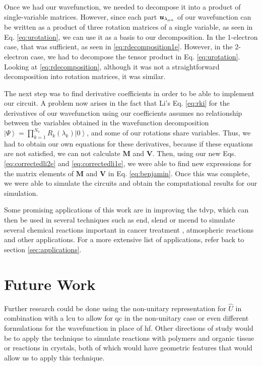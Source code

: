 \documentclass{aux/ttuthes2007}
\newcommand{\ket}[1]{\ensuremath{\left|#1\right\rangle}}
\newcommand{\ind}[1]{{\uo #1 \oo #1}}
\newcommand{\uo}[1]{
		\IfEqCase{#1}{
			{0}{\mu}
			{1}{\nu}
			{2}{\xi}
		}[\PackageError{uo}{Undefined option to uo: #1}{}]
}
\newcommand{\oo}[1]{
		\IfEqCase{#1}{
			{0}{\alpha}
			{1}{\beta}
			{2}{\gamma}
		}[\PackageError{unocorb}{Undefined option to unuo: #1}{}]
}
\begin{document}
Once we had our wavefunction, we needed to decompose it into a product of single-variable matrices.
However, since each part $\bm u_{\lambda_\ind 0}$ of our wavefunction can be written as a product of three rotation matrices of a single variable, as seen in Eq. \ref{eq:urotation}, we can use it as a basis to our decomposition.
In the 1-electron case, that was sufficient, as seen in \ref{eq:rdecomposition1e}.
However, in the 2-electron case, we had to decompose the tensor product in Eq. \ref{eq:urotation}.
Looking at \ref{eq:rdecomposition}, although it was not a straightforward decomposition into rotation matrices, it was similar.

The next step was to find derivative coefficients in order to be able to implement our circuit.
A problem now arises in the fact that Li's  Eq. \ref{eq:rki} for the derivatives of our wavefunction using our coefficients assumes no relationship between the variables obtained in the wavefunction decomposition 
$\ket \Psi = \prod_{k=1}^{N_v} R_k(\lambda_k) \ket 0$,
and some of our rotations share variables.
Thus, we had to obtain our own equations for these derivatives, because if these equations are not satisfied, we can not calculate $\bm M$ and $\bm V$.
Then, using our new Eqs. \ref{eq:correctedli2e} and \ref{eq:correctedli1e}, we were able to find new expressions for the matrix elements of $\bm M$ and $\bm V$ in Eq. \ref{eq:benjamin}.
Once this was complete, we were able to simulate the circuits and obtain the computational results for our simulation. 

Some promising applications of this work are in improving the \gls{tdvp}, which can then be used in several techniques such as \gls{end}, \gls{slend} or \gls{mcend} to simulate several chemical reactions important in cancer treatment , atmospheric reactions  and other applications. For a more extensive list of applications, refer back to section \ref{sec:applications}.

\section{\textbf{Future Work}}

Further research could be done using the non-unitary representation for $\hat U$ in combination with a \gls{lcu} to allow for \gls{qc} in the non-unitary case or even different formulations for the wavefunction in place of \gls{hf}.
Other directions of study would be to apply the technique to simulate reactions with polymers and organic tissue or reactions in crystals, both of which would have geometric features that would allow us to apply this technique.
\end{document}
